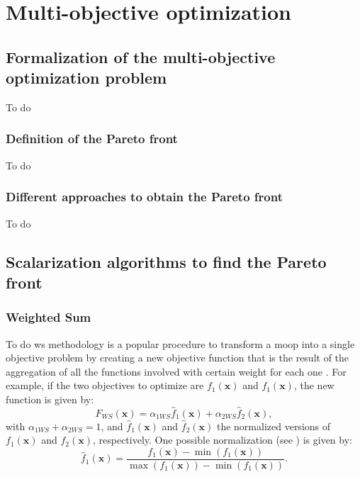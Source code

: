 \chapter{Multi-objective optimization}
\label{sec:Metodolgia}
\section{Formalization of the multi-objective optimization problem}
\label{sec:MOOPForm}
%
To do
\subsection{Definition of the Pareto front}
To do
\subsection{Different approaches to obtain the Pareto front}
To do
\section{Scalarization algorithms to find the Pareto front}
\subsection{Weighted Sum}
\label{sec:WS}
To do
\gls{ws} methodology is a popular procedure to transform a \gls{moop} into a single objective problem by creating a new objective function that is the result of the aggregation of all the functions involved with certain weight for each one \cite{Marler2004}. For example, if the two objectives to optimize are $f_{1}(\mathbf{x})$ and $f_{1}(\mathbf{x})$, the new function is given by:
\begin{equation}
F_{WS}(\mathbf{x}) = \alpha_{1WS} \hat{f}_{1}(\mathbf{x}) + \alpha_{2WS} \hat{f}_{2}(\mathbf{x}),
\label{eq:JWS}
\end{equation}
with $\alpha_{1WS} + \alpha_{2WS}=1$, and $\hat{f}_{1}(\mathbf{x})$ and $\hat{f}_{2}(\mathbf{x})$ the normalized versions of $f_{1}(\mathbf{x})$ and $f_{2}(\mathbf{x})$, respectively. One possible normalization (see \cite{Marler2004}) is given by:
\begin{equation}
\hat{f}_{1}(\mathbf{x}) = \frac{f_{1}(\mathbf{x})-\min{\left( f_{1}(\mathbf{x})\right) }}{\max{(f_{1}(\mathbf{x}))}-\min{\left( f_{1}(\mathbf{x})\right) }}.
\label{eq:NormalizedJ}
\end{equation}


